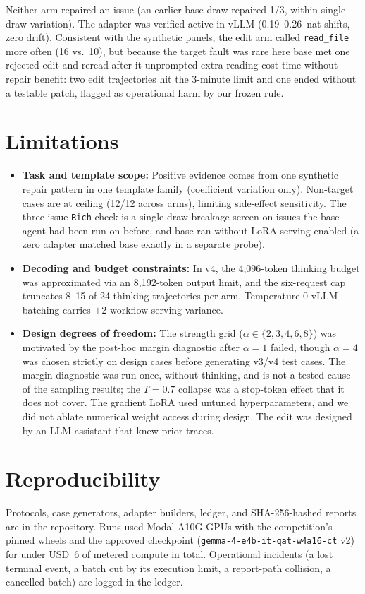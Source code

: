 \documentclass[11pt]{article}
\begin{document}
Neither arm repaired an issue (an earlier base draw repaired 1/3, within single-draw variation). The adapter was verified active in vLLM (0.19--0.26~nat shifts, zero drift). Consistent with the synthetic panels, the edit arm called \texttt{read\_file} more often (16 vs.\ 10), but because the target fault was rare here base met one rejected edit and reread after it unprompted extra reading cost time without repair benefit: two edit trajectories hit the 3-minute limit and one ended without a testable patch, flagged as operational harm by our frozen rule.

\section{Limitations}
\begin{itemize}[leftmargin=*,itemsep=1pt,topsep=2pt]
\item \textbf{Task and template scope:} Positive evidence comes from one synthetic repair pattern in one template family (coefficient variation only). Non-target cases are at ceiling (12/12 across arms), limiting side-effect sensitivity. The three-issue \texttt{Rich} check is a single-draw breakage screen on issues the base agent had been run on before, and base ran without LoRA serving enabled (a zero adapter matched base exactly in a separate probe).
\item \textbf{Decoding and budget constraints:} In v4, the 4,096-token thinking budget was approximated via an 8,192-token output limit, and the six-request cap truncates 8--15 of 24 thinking trajectories per arm. Temperature-0 vLLM batching carries $\pm 2$ workflow serving variance.
\item \textbf{Design degrees of freedom:} The strength grid ($\alpha \in \{2,3,4,6,8\}$) was motivated by the post-hoc margin diagnostic after $\alpha=1$ failed, though $\alpha=4$ was chosen strictly on design cases before generating v3/v4 test cases. The margin diagnostic was run once, without thinking, and is not a tested cause of the sampling results; the $T=0.7$ collapse was a stop-token effect that it does not cover. The gradient LoRA used untuned hyperparameters, and we did not ablate numerical weight access during design. The edit was designed by an LLM assistant that knew prior traces.
\end{itemize}

\section{Reproducibility}
Protocols, case generators, adapter builders, ledger, and SHA-256-hashed reports are in the repository. Runs used Modal A10G GPUs with the competition's pinned wheels and the approved checkpoint (\texttt{gemma-4-e4b-it-qat-w4a16-ct} v2) for under USD~6 of metered compute in total. Operational incidents (a lost terminal event, a batch cut by its execution limit, a report-path collision, a cancelled batch) are logged in the ledger.
\end{document}
